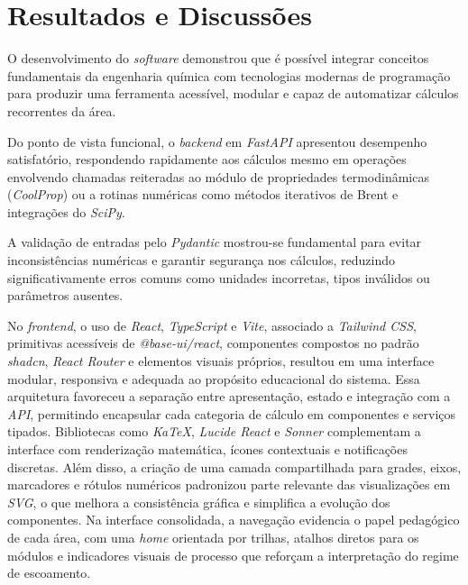 \chapter{Resultados e Discussões}

O desenvolvimento do \textit{software} demonstrou que é possível integrar conceitos fundamentais da engenharia química com tecnologias modernas de programação para produzir uma ferramenta acessível, modular e capaz de automatizar cálculos recorrentes da área.

Do ponto de vista funcional, o \textit{backend} em \textit{FastAPI} apresentou desempenho satisfatório, respondendo rapidamente aos cálculos mesmo em operações envolvendo chamadas reiteradas ao módulo de propriedades termodinâmicas (\textit{CoolProp}) ou a rotinas numéricas como métodos iterativos de Brent e integrações do \textit{SciPy}.

A validação de entradas pelo \textit{Pydantic} mostrou-se fundamental para evitar inconsistências numéricas e garantir segurança nos cálculos, reduzindo significativamente erros comuns como unidades incorretas, tipos inválidos ou parâmetros ausentes.

No \textit{frontend}, o uso de \textit{React}, \textit{TypeScript} e \textit{Vite}, associado a \textit{Tailwind CSS}, primitivas acessíveis de \textit{@base-ui/react}, componentes compostos no padrão \textit{shadcn}, \textit{React Router} e elementos visuais próprios, resultou em uma interface modular, responsiva e adequada ao propósito educacional do sistema. Essa arquitetura favoreceu a separação entre apresentação, estado e integração com a \textit{API}, permitindo encapsular cada categoria de cálculo em componentes e serviços tipados. Bibliotecas como \textit{KaTeX}, \textit{Lucide React} e \textit{Sonner} complementam a interface com renderização matemática, ícones contextuais e notificações discretas. Além disso, a criação de uma camada compartilhada para grades, eixos, marcadores e rótulos numéricos padronizou parte relevante das visualizações em \textit{SVG}, o que melhora a consistência gráfica e simplifica a evolução dos componentes. Na interface consolidada, a navegação evidencia o papel pedagógico de cada área, com uma \textit{home} orientada por trilhas, atalhos diretos para os módulos e indicadores visuais de processo que reforçam a interpretação do regime de escoamento.

